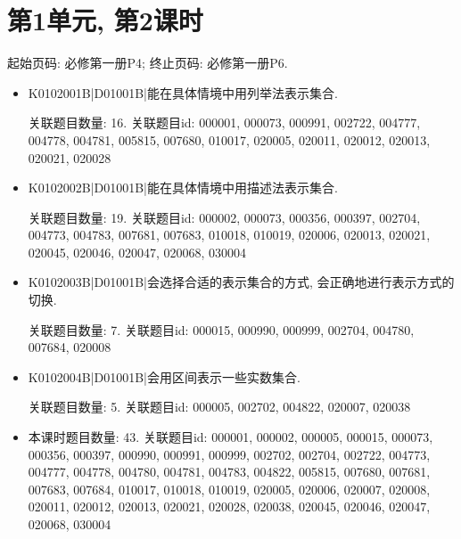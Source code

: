 \section*{第1单元, 第2课时}
起始页码: 必修第一册P4; 终止页码: 必修第一册P6.
\begin{itemize}
\item K0102001B|D01001B|能在具体情境中用列举法表示集合.

关联题目数量: 16. 关联题目id: 000001, 000073, 000991, 002722, 004777, 004778, 004781, 005815, 007680, 010017, 020005, 020011, 020012, 020013, 020021, 020028

\item K0102002B|D01001B|能在具体情境中用描述法表示集合.

关联题目数量: 19. 关联题目id: 000002, 000073, 000356, 000397, 002704, 004773, 004783, 007681, 007683, 010018, 010019, 020006, 020013, 020021, 020045, 020046, 020047, 020068, 030004

\item K0102003B|D01001B|会选择合适的表示集合的方式, 会正确地进行表示方式的切换.

关联题目数量: 7. 关联题目id: 000015, 000990, 000999, 002704, 004780, 007684, 020008

\item K0102004B|D01001B|会用区间表示一些实数集合.

关联题目数量: 5. 关联题目id: 000005, 002702, 004822, 020007, 020038

\item 本课时题目数量: 43. 关联题目id: 000001, 000002, 000005, 000015, 000073, 000356, 000397, 000990, 000991, 000999, 002702, 002704, 002722, 004773, 004777, 004778, 004780, 004781, 004783, 004822, 005815, 007680, 007681, 007683, 007684, 010017, 010018, 010019, 020005, 020006, 020007, 020008, 020011, 020012, 020013, 020021, 020028, 020038, 020045, 020046, 020047, 020068, 030004

\end{itemize}

